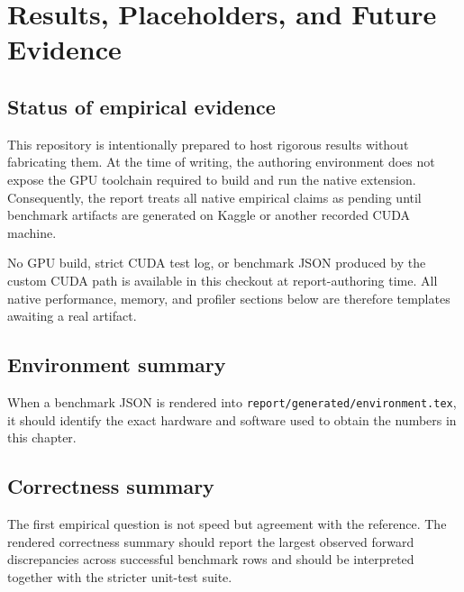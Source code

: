 \chapter{Results, Placeholders, and Future Evidence}
\label{chap:results}

\section{Status of empirical evidence}

This repository is intentionally prepared to host rigorous results without fabricating them. At the time of writing, the authoring environment does not expose the GPU toolchain required to build and run the native extension. Consequently, the report treats all native empirical claims as pending until benchmark artifacts are generated on Kaggle or another recorded CUDA machine.

\begin{resultplaceholder}
No GPU build, strict CUDA test log, or benchmark JSON produced by the custom CUDA path is available in this checkout at report-authoring time. All native performance, memory, and profiler sections below are therefore templates awaiting a real artifact.
\end{resultplaceholder}

\section{Environment summary}

When a benchmark JSON is rendered into \texttt{report/generated/environment.tex}, it should identify the exact hardware and software used to obtain the numbers in this chapter.


\section{Correctness summary}

The first empirical question is not speed but agreement with the reference. The rendered correctness summary should report the largest observed forward discrepancies across successful benchmark rows and should be interpreted together with the stricter unit-test suite.

